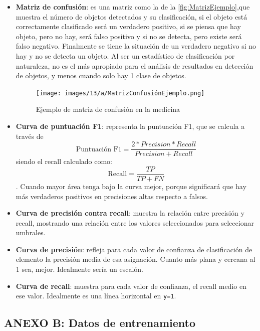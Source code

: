 \begin{itemize}
    \item \textbf{Matriz de confusión}: es una matriz como la de la \autoref{fig:MatrizEjemplo},que muestra el número de objetos detectados y su clasificación, si el objeto está correctamente clasificado será un verdadero positivo, si 
    se piensa que hay objeto, pero no hay, será falso positivo y si no se detecta, pero existe será falso negativo. Finalmente se tiene la situación de un verdadero negativo si no hay y no se detecta un objeto. Al ser un 
    estadístico de clasificación por naturaleza, no es el más apropiado para el análisis de resultados en detección de objetos, y menos cuando solo hay 1 clase de objetos.

    \begin{figure}[H]
        \centering
        \texttt{[image: images/13/a/MatrizConfusiónEjemplo.png]}
        \caption{Ejemplo de matriz de confusión en la medicina}
        \label{fig:MatrizEjemplo}
    \end{figure}

    \item \textbf{Curva de puntuación F1}: representa la puntuación F1, que se calcula a través de \begin{equation*}\text{Puntuación F1} = \frac{2*Precision*Recall}{Precision+Recall}\end{equation*} siendo el recall 
    calculado como: \begin{equation*}\text{Recall} = \frac{TP}{TP+FN}\end{equation*}. Cuando mayor área tenga bajo la curva mejor, porque significará que hay más verdaderos positivos en precisiones altas respecto a falsos.
    \item \textbf{Curva de precisión contra recall}: muestra la relación entre precisión y recall, mostrando una relación entre los valores seleccionados para seleccionar umbrales.
    \item \textbf{Curva de precisión}: refleja para cada valor de confianza de clasificación de elemento la precisión media de esa asignación. Cuanto más plana y cercana al 1 sea, mejor. Idealmente sería un escalón.
    \item \textbf{Curva de recall}: muestra para cada valor de confianza, el recall medio en ese valor. Idealmente es una línea horizontal en \texttt{y=1}.
\end{itemize}


\clearpage
\subsection*{ANEXO B: Datos de entrenamiento}
\label{subsec:B}
